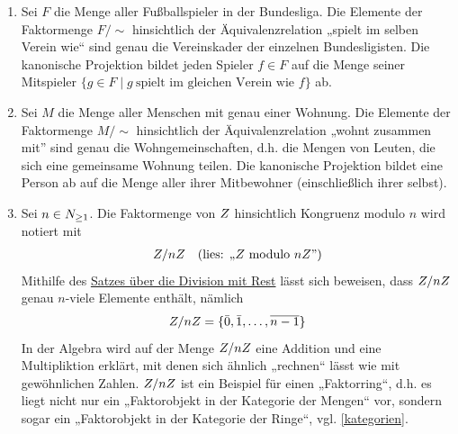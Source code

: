 \begin{bsp} \label{bsp:faktormenge} \quad
    \begin{enumerate}
        \item Sei $F$ die Menge aller Fußballspieler in der Bundesliga. Die Elemente der Faktormenge $F/{\sim}$ hinsichtlich der Äquivalenzrelation „spielt im selben Verein wie“ sind genau die Vereinskader der einzelnen Bundesligisten. Die kanonische Projektion bildet jeden Spieler $f\in F$ auf die Menge seiner Mitspieler $\{g\in F\mid g\ \text{spielt im gleichen Verein wie $f$}\}$ ab.
        \item Sei $M$ die Menge aller Menschen mit genau einer Wohnung. Die Elemente der Faktormenge $M/{\sim}$ hinsichtlich der Äquivalenzrelation „wohnt zusammen mit” sind genau die Wohngemeinschaften, d.h. die Mengen von Leuten, die sich eine gemeinsame Wohnung teilen. Die kanonische Projektion bildet eine Person ab auf die Menge aller ihrer Mitbewohner (einschließlich ihrer selbst).
        \item Sei $n\in \relax N_{\ge 1}$. Die Faktormenge von $\relax Z$ hinsichtlich Kongruenz modulo $n$ wird notiert mit
        \begin{align*}
            \relax Z/n\relax Z && (\text{lies: „$\relax Z$ modulo $n\relax Z$”})
        \end{align*}
        Mithilfe des \href{https://de.wikipedia.org/wiki/Division_mit_Rest}{Satzes über die Division mit Rest} lässt sich beweisen, dass $\relax Z/n\relax Z$ genau $n$-viele Elemente enthält, nämlich
        \[ \relax Z/n\relax Z = \{\bar 0,\bar 1,\dots , \overline{n-1} \} \]
        In der Algebra wird auf der Menge $\relax Z/n\relax Z$ eine Addition und eine Multipliktion erklärt, mit denen sich ähnlich „rechnen“ lässt wie mit gewöhnlichen Zahlen. $\relax Z/n\relax Z$ ist ein Beispiel für einen „Faktorring“, d.h. es liegt nicht nur ein „Faktorobjekt in der Kategorie der Mengen“ vor, sondern sogar ein „Faktorobjekt in der Kategorie der Ringe“, vgl. \cref{kategorien}.
    \end{enumerate}
\end{bsp}


